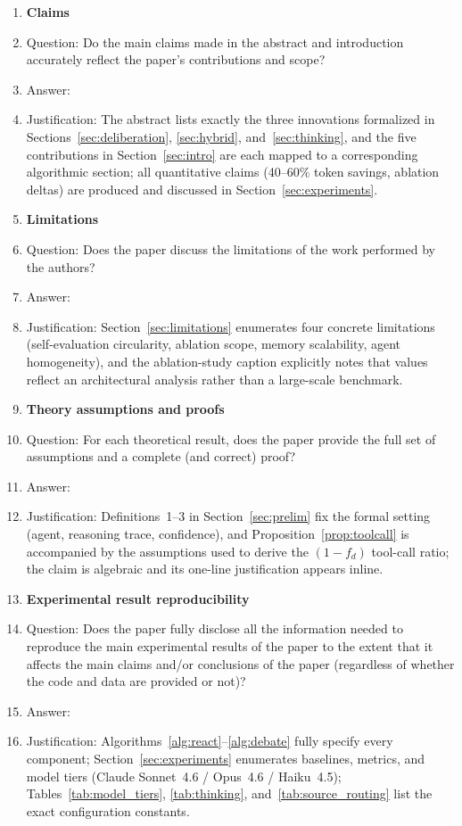 \documentclass{article}
\theoremstyle{plain}
\theoremstyle{definition}
\begin{document}
\begin{enumerate}

\item {\bf Claims}
    \item[] Question: Do the main claims made in the abstract and introduction accurately reflect the paper's contributions and scope?
    \item[] Answer: \answerYes{}
    \item[] Justification: The abstract lists exactly the three innovations formalized in Sections~\ref{sec:deliberation}, \ref{sec:hybrid}, and~\ref{sec:thinking}, and the five contributions in Section~\ref{sec:intro} are each mapped to a corresponding algorithmic section; all quantitative claims (40--60\% token savings, ablation deltas) are produced and discussed in Section~\ref{sec:experiments}.

\item {\bf Limitations}
    \item[] Question: Does the paper discuss the limitations of the work performed by the authors?
    \item[] Answer: \answerYes{}
    \item[] Justification: Section~\ref{sec:limitations} enumerates four concrete limitations (self-evaluation circularity, ablation scope, memory scalability, agent homogeneity), and the ablation-study caption explicitly notes that values reflect an architectural analysis rather than a large-scale benchmark.

\item {\bf Theory assumptions and proofs}
    \item[] Question: For each theoretical result, does the paper provide the full set of assumptions and a complete (and correct) proof?
    \item[] Answer: \answerYes{}
    \item[] Justification: Definitions~1--3 in Section~\ref{sec:prelim} fix the formal setting (agent, reasoning trace, confidence), and Proposition~\ref{prop:toolcall} is accompanied by the assumptions used to derive the $(1-f_d)$ tool-call ratio; the claim is algebraic and its one-line justification appears inline.

\item {\bf Experimental result reproducibility}
    \item[] Question: Does the paper fully disclose all the information needed to reproduce the main experimental results of the paper to the extent that it affects the main claims and/or conclusions of the paper (regardless of whether the code and data are provided or not)?
    \item[] Answer: \answerYes{}
    \item[] Justification: Algorithms~\ref{alg:react}--\ref{alg:debate} fully specify every component; Section~\ref{sec:experiments} enumerates baselines, metrics, and model tiers (Claude Sonnet~4.6 / Opus~4.6 / Haiku~4.5); Tables~\ref{tab:model_tiers}, \ref{tab:thinking}, and~\ref{tab:source_routing} list the exact configuration constants.


\end{enumerate}
\end{document}
